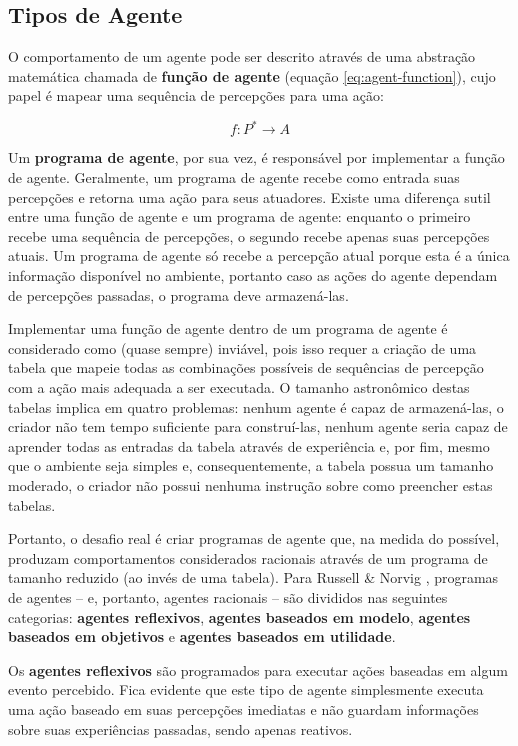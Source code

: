 \subsection{Tipos de Agente}
O comportamento de um agente pode ser descrito através de uma abstração
matemática chamada de \textbf{função de agente} (equação
\ref{eq:agent-function}), cujo papel é mapear uma sequência de percepções para
uma ação:

\begin{equation}
	\label{eq:agent-function}
	f : P^* \rightarrow A
\end{equation}

Um \textbf{programa de agente}, por sua vez, é responsável por implementar a
função de agente. Geralmente, um programa de agente recebe como entrada suas
percepções e retorna uma ação para seus atuadores. Existe uma diferença sutil
entre uma função de agente e um programa de agente: enquanto o primeiro recebe
uma sequência de percepções, o segundo recebe apenas suas percepções atuais. Um
programa de agente só recebe a percepção atual porque esta é a única informação
disponível no ambiente, portanto caso as ações do agente dependam de percepções
passadas, o programa deve armazená-las.

Implementar uma função de agente dentro de um programa de agente é considerado
como (quase sempre) inviável, pois isso requer a criação de uma tabela que
mapeie todas as combinações possíveis de sequências de percepção com a ação mais
adequada a ser executada. O tamanho astronômico destas tabelas implica em quatro
problemas: nenhum agente é capaz de armazená-las, o criador não tem tempo
suficiente para construí-las, nenhum agente seria capaz de aprender todas as
entradas da tabela através de experiência e, por fim, mesmo que o ambiente seja
simples e, consequentemente, a tabela possua um tamanho moderado, o criador não
possui nenhuma instrução sobre como preencher estas tabelas.

Portanto, o desafio real é criar programas de agente que, na medida do possível,
produzam comportamentos considerados racionais através de um programa de tamanho
reduzido (ao invés de uma tabela). Para Russell \& Norvig
\cite{RussellNorvig200912}, programas de agentes -- e, portanto, agentes
racionais -- são divididos nas seguintes categorias: \textbf{agentes
reflexivos}, \textbf{agentes baseados em modelo}, \textbf{agentes baseados em
objetivos} e \textbf{agentes baseados em utilidade}.

Os \textbf{agentes reflexivos} são programados para executar ações baseadas em
algum evento percebido. Fica evidente que este tipo de agente simplesmente
executa uma ação baseado em suas percepções imediatas e não guardam informações
sobre suas experiências passadas, sendo apenas reativos.

